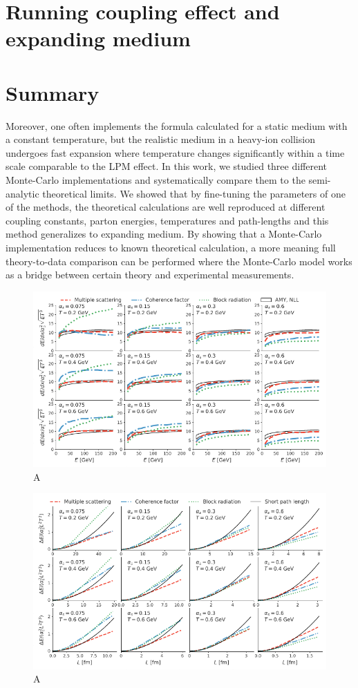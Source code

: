\documentclass[aps, prc, reprint, amsmath, groupedaddress, nofootinbib]{revtex4-1}
\begin{document}
\section{Running coupling effect and expanding medium}

\section{Summary}
Moreover, one often implements the formula calculated for a static medium with a constant temperature, but the realistic medium in a heavy-ion collision undergoes fast expansion where temperature changes significantly within a time scale comparable to the LPM effect.
In this work, we studied three different Monte-Carlo implementations and systematically compare them to the semi-analytic theoretical limits.
We showed that by fine-tuning the parameters of one of the methods, the theoretical calculations are well reproduced at different coupling constants, parton energies, temperatures and path-lengths and this method generalizes to expanding medium. 
By showing that a Monte-Carlo implementation reduces to known theoretical calculation, a more meaning full theory-to-data comparison can be performed where the Monte-Carlo model works as a bridge between certain theory and experimental measurements.

\begin{figure}
\includegraphics[width=\textwidth]{Eloss_infinite.pdf}
\caption{A}
\label{fig:eloss-inf}
\end{figure}

\begin{figure}
\includegraphics[width=\textwidth]{Eloss_Ldep.pdf}
\caption{A}
\label{fig:eloss-ldep}
\end{figure}
\end{document}
